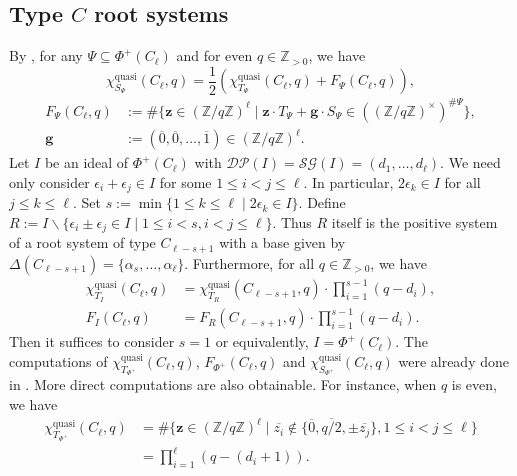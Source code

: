 \documentclass[12pt]{amsart}
\theoremstyle{plain}
\theoremstyle{definition}
\theoremstyle{remark}
\newcommand{\Z}{\mathbb{Z}}
\newcommand{\quasi}{\operatorname{quasi}}
\newcommand{\DP}{{\mathcal{DP}}}
\newcommand{\SG}{{\mathcal{SG}}}
\begin{document}
\subsection{Type $C$ root systems}
By \cite[Theorem 4.1]{KTT07}, for any $\Psi\subseteq\Phi^+(C_\ell)$ and for even $q \in \Z_{>0}$,  we have
\begin{equation*}\label{eq:C-TS}
\chi^{\quasi}_{S_\Psi}(C_\ell, q)=\frac12\left( \chi^{\quasi}_{T_\Psi}(C_\ell, q)+F_\Psi(C_\ell, q)\right),
\end{equation*}
\begin{align*}
F_\Psi(C_\ell, q) & :=\# \{ \textbf{z}\in  (\Z/q\Z)^\ell  \mid \textbf{z}\cdot T_\Psi+\textbf{g}\cdot S_\Psi\in ((\Z/q\Z)^\times)^{\#\Psi}\}, \\
\textbf{g} & := (\overline0,\overline0,\ldots,\overline1) \in  (\Z/q\Z)^\ell .
\end{align*} 
Let $I$ be an ideal of  $\Phi^+(C_\ell)$ with $\DP(I)=\SG(I)=(d_1,\ldots,d_\ell)$.
We need only consider $\epsilon_i + \epsilon_{j} \in I$ for some $1 \le i < j \le \ell$. 
In particular, $2\epsilon_k \in I$ for all $j \le k \le \ell$. 
Set $s:=\min \{ 1 \le k \le \ell \mid 2\epsilon_k \in I\}$. 
Define $R:=I \smallsetminus \{ \epsilon_i \pm \epsilon_{j} \in I \mid 1\le i<s, i <j \le \ell\}$. 
Thus $R$ itself is the positive system of a root system of type $C_{\ell-s+1}$ with a base given by $\Delta(C_{\ell-s+1})=\{\alpha_s,\ldots,\alpha_\ell\}$. 
Furthermore, for all $q \in \Z_{>0}$, we have
\begin{equation*}\label{eq:inductive-C}
\begin{aligned}
\chi^{\quasi}_{T_I}(C_\ell, q) & =\chi^{\quasi}_{T_R}(C_{\ell-s+1}, q)\cdot \prod_{i=1}^{s-1}(q-d_i),\\
F_I(C_\ell, q) &= F_R(C_{\ell-s+1}, q)\cdot \prod_{i=1}^{s-1}(q-d_i).
\end{aligned}
\end{equation*}
Then it suffices to consider $s=1$ or equivalently, $I=\Phi^+(C_\ell)$. 
The computations of $\chi^{\quasi}_{T_{\Phi^+}}(C_\ell, q)$, $F_{\Phi^+}(C_\ell, q)$ and $\chi^{\quasi}_{S_{\Phi^+}}(C_\ell, q)$ were already done in 
\cite[Theorem 4.7 and \S4.3]{KTT07}. 
More direct computations are also obtainable. 
For instance, when $q$ is even, we have
\begin{align*}
\chi^{\quasi}_{T_{\Phi^+}}(C_\ell, q) & =\# \{ \textbf{z}  \in   (\Z/q\Z)^\ell  \mid \overline{z_i} \notin \{ \overline0, \overline{q/2},\pm\overline{z_j}\}, 1 \le i <j \le \ell \}\\ 
&= \prod_{i=1}^{\ell}(q-(d_i+1)).
\end{align*}
\end{document}
